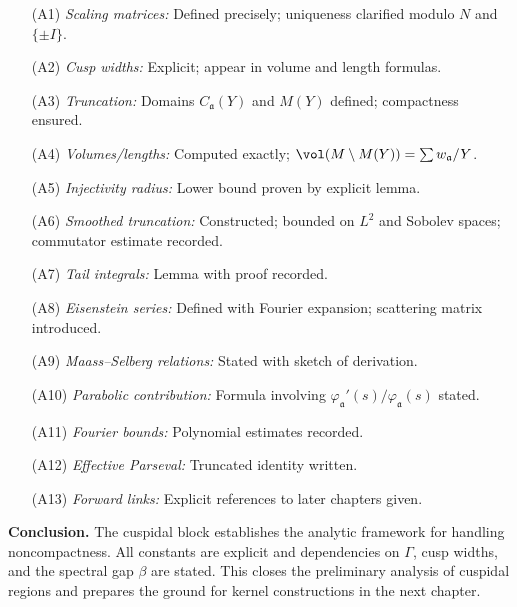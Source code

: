 \begin{itemize}
  \item[(A1)] \emph{Scaling matrices:} Defined precisely; uniqueness clarified modulo $N$ and $\{\pm I\}$.
  \item[(A2)] \emph{Cusp widths:} Explicit; appear in volume and length formulas.
  \item[(A3)] \emph{Truncation:} Domains $C_{\mathfrak{a}}(Y)$ and $M(Y)$ defined; compactness ensured.
  \item[(A4)] \emph{Volumes/lengths:} Computed exactly; $\vol(M\setminus M(Y)) = \sum w_{\mathfrak{a}}/Y$.
  \item[(A5)] \emph{Injectivity radius:} Lower bound proven by explicit lemma.
  \item[(A6)] \emph{Smoothed truncation:} Constructed; bounded on $L^{2}$ and Sobolev spaces; commutator estimate recorded.
  \item[(A7)] \emph{Tail integrals:} Lemma with proof recorded.
  \item[(A8)] \emph{Eisenstein series:} Defined with Fourier expansion; scattering matrix introduced.
  \item[(A9)] \emph{Maass–Selberg relations:} Stated with sketch of derivation.
  \item[(A10)] \emph{Parabolic contribution:} Formula involving $\varphi_{\mathfrak{a}}'(s)/\varphi_{\mathfrak{a}}(s)$ stated.
  \item[(A11)] \emph{Fourier bounds:} Polynomial estimates recorded.
  \item[(A12)] \emph{Effective Parseval:} Truncated identity written.
  \item[(A13)] \emph{Forward links:} Explicit references to later chapters given.
\end{itemize}

\medskip

\noindent\textbf{Conclusion.}
The cuspidal block establishes the analytic framework for handling noncompactness.
All constants are explicit and dependencies on $\Gamma$, cusp widths, and the spectral gap $\beta$
are stated.
This closes the preliminary analysis of cuspidal regions and prepares the ground
for kernel constructions in the next chapter.

